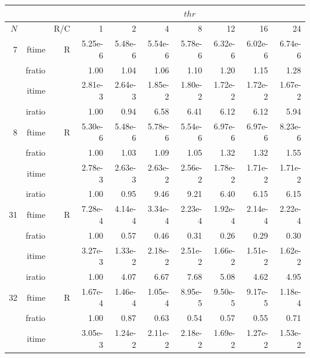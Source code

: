 \documentclass[a4paper]{article}
\begin{document}
\begin{table}
\begin{center}
\begin{tabular}{|r|r|r|r|r|r|r|r|r|r|}
\hline 
     \multicolumn{3}{|c|}{ } & \multicolumn{7}{c|}{$thr$} \\ \hline
    $N$  & & R/C  & 1           & 2    & 4    & 8    & 12   & 16    & 24  \\ \hline\hline
    7  & ftime & R  &   5.25e-6 &   5.48e-6 &   5.54e-6 &   5.78e-6 &   6.32e-6 &   6.02e-6 &   6.74e-6    \\ 
    & fratio & &        1.00 &   1.04 &   1.06 &   1.10 &   1.20 &   1.15 &   1.28   \\ 
     & itime & &        2.81e-3 &   2.64e-3 &   1.85e-2 &   1.80e-2 &   1.72e-2 &   1.72e-2 &   1.67e-2       \\ 
     & iratio & &       1.00 &   0.94 &   6.58 &   6.41 &   6.12 &   6.12 &   5.94         \\ \hline 
    8  & ftime & R  &   5.30e-6 &   5.48e-6 &   5.78e-6 &   5.54e-6 &   6.97e-6 &   6.97e-6 &   8.23e-6    \\ 
      & fratio & &      1.00 &   1.03 &   1.09 &   1.05 &   1.32 &   1.32 &   1.55     \\ 
     & itime & &        2.78e-3 &   2.63e-3 &   2.63e-2 &   2.56e-2 &   1.78e-2 &   1.71e-2 &   1.71e-2       \\ 
     & iratio & &       1.00 &   0.95 &   9.46 &   9.21 &   6.40 &   6.15 &   6.15      \\ \hline 
   31  & ftime & R  &   7.28e-4 &   4.14e-4 &   3.34e-4 &   2.23e-4 &   1.92e-4 &   2.14e-4 &   2.22e-4   \\ 
      & fratio & &      1.00 &   0.57 &   0.46 &   0.31 &   0.26 &   0.29 &   0.30      \\ 
     & itime & &        3.27e-3 &   1.33e-2 &   2.18e-2 &   2.51e-2 &   1.66e-2 &   1.51e-2 &   1.62e-2      \\ 
     & iratio & &       1.00 &   4.07 &   6.67 &   7.68 &   5.08 &   4.62 &   4.95     \\ \hline 
   32  & ftime & R  &   1.67e-4 &   1.46e-4 &   1.05e-4 &   8.95e-5 &   9.50e-5 &   9.17e-5 &   1.18e-4   \\ 
      & fratio & &      1.00 &   0.87 &   0.63 &   0.54 &   0.57 &   0.55 &   0.71       \\ 
     & itime & &        3.05e-3 &   1.24e-2 &   2.11e-2 &   2.18e-2 &   1.69e-2 &   1.27e-2 &   1.53e-2       \\ 

\end{tabular}
\end{center}
\end{table}
\end{document}
